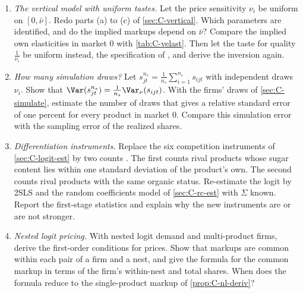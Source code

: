 \begin{enumerate}
\item \emph{The vertical model with uniform tastes.} Let the price sensitivity $\nu_i$ be uniform on
  $[0, \bar\nu]$. Redo parts (a) to (c) of \cref{sec:C-vertical}. Which parameters are identified, and do the implied
  markups depend on $\bar\nu$? Compare the implied own elasticities in market 0 with \cref{tab:C-velast}. Then let the
  taste for quality $\frac{1}{\nu_i}$ be uniform instead, the specification of \citet{Bresnahan1987}, and derive the
  inversion again.

\item \emph{How many simulation draws?} Let $s^{n_s}_{jt} = \frac{1}{n_s}\sum_{i=1}^{n_s}s_{ijt}$ with independent
  draws $\nu_i$. Show that $\Var(s^{n_s}_{jt}) = \frac{1}{n_s}\Var_\nu(s_{ijt})$. With the firms' draws of
  \cref{sec:C-simulate}, estimate the number of draws that gives a relative standard error of one percent for every
  product in market 0. Compare this simulation error with the sampling error of the realized shares.

\item \emph{Differentiation instruments.} Replace the six competition instruments of \cref{sec:C-logit-est} by two
  counts \citep{GandhiHoude2019}. The first counts rival products whose sugar content lies within one standard
  deviation of the product's own. The second counts rival products with the same organic status. Re-estimate the logit by 2SLS and the random
  coefficients model of \cref{sec:C-rc-est} with $\Sigma$ known. Report the first-stage statistics and explain why the
  new instruments are or are not stronger.

\item \emph{Nested logit pricing.} With nested logit demand and multi-product firms, derive the first-order
  conditions for prices. Show that markups are common within each pair of a firm and a nest, and give the formula
  for the common markup in terms of the firm's within-nest and total shares. When does the formula reduce to the
  single-product markup of \cref{prop:C-nl-deriv}?
\end{enumerate}
